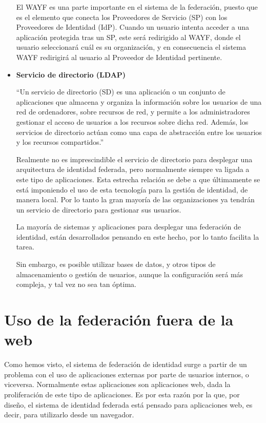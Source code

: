 \begin{itemize}
    El WAYF es una parte importante en el sistema de la federación,
    puesto que es el elemento que conecta los Proveedores de
    Servicio (SP) con los Proveedores de Identidad (IdP). Cuando un
    usuario intenta acceder a una aplicación protegida tras un SP,
    este será redirigido al WAYF, donde el usuario seleccionará cuál
    es su organización, y en consecuencia el sistema WAYF redirigirá
    al usuario al Proveedor de Identidad pertinente.

            \item \textbf{Servicio de directorio (LDAP)}

    ``Un servicio de directorio (SD) es una aplicación o un conjunto
    de aplicaciones que almacena y organiza la información sobre los
    usuarios de una red de ordenadores, sobre recursos de red, y
    permite a los administradores gestionar el acceso de usuarios a
    los recursos sobre dicha red. Además, los servicios de directorio
    actúan como una capa de abstracción entre los usuarios y los
    recursos compartidos.''

    Realmente no es imprescindible el servicio de directorio para
    desplegar una arquitectura de identidad federada, pero normalmente
    siempre va ligada a este tipo de aplicaciones. Esta estrecha
    relación se debe a que últimamente se está imponiendo el uso de
    esta tecnología para la gestión de identidad, de manera local. Por
    lo tanto la gran mayoría de las organizaciones ya tendrán un
    servicio de directorio para gestionar sus usuarios.

    La mayoría de sistemas y aplicaciones para desplegar una
    federación de identidad, están desarrollados pensando en este
    hecho, por lo tanto facilita la tarea.

    Sin embargo, es posible utilizar bases de datos, y otros tipos de
    almacenamiento o gestión de usuarios, aunque la configuración será
    más compleja, y tal vez no sea tan óptima.

            \end{itemize}

    \section{Uso de la federación fuera de la web}

    Como hemos visto, el sistema de federación de identidad surge a partir
    de un problema con el uso de aplicaciones externas por parte de
    usuarios internos, o viceversa. Normalmente estas aplicaciones son
    aplicaciones web, dada la proliferación de este tipo de aplicaciones.
    Es por esta razón por la que, por diseño, el sistema de identidad
    federada está pensado para aplicaciones web, es decir, para utilizarlo
    desde un navegador.

